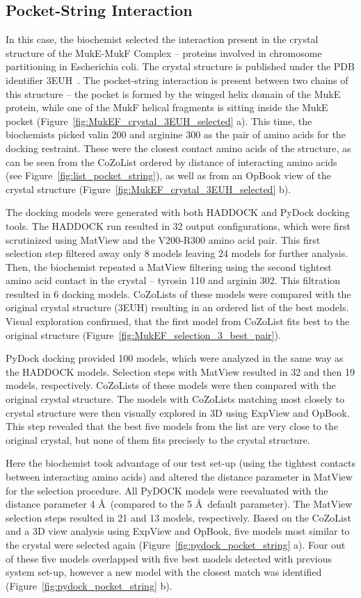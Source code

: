 \documentclass{bmcart}
\begin{document}
\subsection{Pocket-String Interaction}
In this case, the biochemist selected the interaction present in the crystal structure of the MukE-MukF Complex -- proteins involved in chromosome partitioning in Escherichia coli. 
The crystal structure is published under the PDB identifier 3EUH~\cite{Woo}. 
The pocket-string interaction is present between two chains of this structure -- the pocket is formed by the winged helix domain of the MukE protein, while one of the MukF helical fragments is sitting inside the MukE pocket (Figure~\ref{fig:MukEF_crystal_3EUH_selected} a). 
This time, the biochemists picked valin 200 and arginine 300 as the pair of amino acids for the docking restraint. 
These were the closest contact amino acids of the structure, as can be seen from the CoZoList ordered by distance of interacting amino acids (see Figure~\ref{fig:list_pocket_string}), as well as from an OpBook view of the crystal structure (Figure~\ref{fig:MukEF_crystal_3EUH_selected} b). 

The docking models were generated with both HADDOCK and PyDock docking tools.
The HADDOCK run resulted in 32 output configurations, which were first scrutinized using MatView and the V200-R300 amino acid pair. 
This first selection step filtered away only 8 models leaving 24 models for further analysis. 
Then, the biochemist repeated a MatView filtering using the second tightest amino acid contact in the crystal -- tyrosin 110 and arginin 302. 
This filtration resulted in 6 docking models. 
CoZoLists of these models were compared with the original crystal structure (3EUH) resulting in an ordered list of the best models.
Visual exploration confirmed, that the first model from CoZoList fits best to the original structure (Figure~\ref{fig:MukEF_selection_3_best_pair}). 

PyDock docking provided 100 models, which were analyzed in the same way as the HADDOCK models. 
Selection steps with MatView resulted in 32 and then 19 models, respectively. 
CoZoLists of these models were then compared with the original crystal structure.
The models with CoZoLists matching most closely to crystal structure were then visually explored in 3D using ExpView and OpBook.
This step revealed that the best five models from the list are very close to the original crystal, but none of them fits precisely to the crystal structure.

Here the biochemist took advantage of our test set-up (using the tightest contacts between interacting amino acids) and altered the distance parameter in MatView for the selection procedure. 
All PyDOCK models were reevaluated with the distance parameter 4 \AA~(compared to the 5 \AA~default parameter). 
The MatView selection steps resulted in 21 and 13 models, respectively. 
Based on the CoZoList and a 3D view analysis using ExpView and OpBook, five models most similar to the crystal were selected again (Figure~\ref{fig:pydock_pocket_string} a). Four out of these five models overlapped with five best models detected with previous system set-up, however a new model with the closest match was identified (Figure~\ref{fig:pydock_pocket_string} b).
\end{document}
